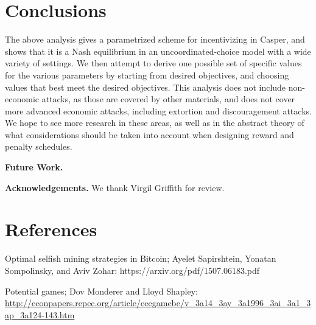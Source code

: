 \documentclass[12pt, final]{article}
\begin{document}
\section{Conclusions}

The above analysis gives a parametrized scheme for incentivizing in Casper, and shows that it is a Nash equilibrium in an uncoordinated-choice model with a wide variety of settings. We then attempt to derive one possible set of specific values for the various parameters by starting from desired objectives, and choosing values that best meet the desired objectives. This analysis does not include non-economic attacks, as those are covered by other materials, and does not cover more advanced economic attacks, including extortion and discouragement attacks. We hope to see more research in these areas, as well as in the abstract theory of what considerations should be taken into account when designing reward and penalty schedules.


\textbf{Future Work.} 

\textbf{Acknowledgements.}  We thank Virgil Griffith for review.

\section{References}


Optimal selfish mining strategies in Bitcoin; Ayelet Sapirshtein, Yonatan Sompolinsky, and Aviv Zohar: https://arxiv.org/pdf/1507.06183.pdf

Potential games; Dov Monderer and Lloyd Shapley: \url{http://econpapers.repec.org/article/eeegamebe/v\_3a14\_3ay\_3a1996\_3ai\_3a1\_3ap\_3a124-143.htm}


\end{document}
